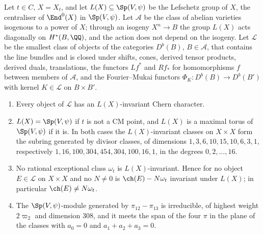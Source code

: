 \begin{theorem}\label{thm:lefschetzclosure}
Let $t\in C$, $X=X_{t}$, and let $L(X)\subseteq\Sp(V,\psi)$ be the Lefschetz
group of $X$, the centraliser of $\End^{0}(X)$ in $\Sp(V,\psi)$. Let
$\mathcal{A}$ be the class of abelian varieties isogenous to a power of $X$;
through an isogeny $X^{n}\to B$ the group $L(X)$ acts diagonally on
$H^{*}(B,\QQ)$, and the action does not depend on the isogeny. Let
$\mathcal{L}$ be the smallest class of objects of the categories
$D^{b}(B)$, $B\in\mathcal{A}$, that contains the line bundles and is closed
under shifts, cones, derived tensor products, derived duals, translations,
the functors $Lf^{*}$ and $Rf_{*}$ for homomorphisms $f$ between members of
$\mathcal{A}$, and the Fourier--Mukai functors $\Phi_{K}\colon D^{b}(B)\to
D^{b}(B')$ with kernel $K\in\mathcal{L}$ on $B\times B'$.
\begin{enumerate}[label=\textup{(\roman*)},leftmargin=2.6em,itemsep=2pt]
\item Every object of $\mathcal{L}$ has an $L(X)$-invariant Chern character.
\item $L(X)=\Sp(V,\psi)$ if $t$ is not a CM point, and $L(X)$ is a maximal
  torus of $\Sp(V,\psi)$ if it is. In both cases the $L(X)$-invariant classes
  on $X\times X$ form the subring generated by divisor classes, of dimensions
  $1,3,6,10,15,10,6,3,1$, respectively $1,16,100,304,454,304,100,16,1$, in
  the degrees $0,2,\dots,16$.
\item No rational exceptional class $\omega_{t}$ is $L(X)$-invariant. Hence
  for no object $E\in\mathcal{L}$ on $X\times X$ and no $N\ne0$ is
  $\ch(E)-N\omega_{t}$ invariant under $L(X)$; in particular
  $\ch(E)\ne N\omega_{t}$.
\item The $\Sp(V,\psi)$-module generated by $\pi_{12}-\pi_{13}$ is
  irreducible, of highest weight $2\varpi_{2}$ and dimension $308$, and it
  meets the span of the four $\pi$ in the plane of the classes with
  $a_{0}=0$ and $a_{1}+a_{2}+a_{3}=0$.
\end{enumerate}
\end{theorem}

